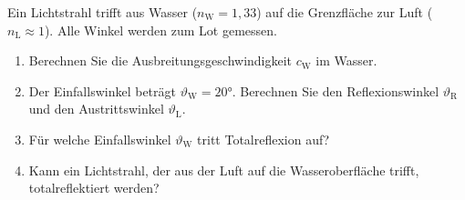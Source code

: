 \begin{ExerciseBlock}
Ein Lichtstrahl trifft aus Wasser ($n_\mathrm W=1{,}33$) auf die Grenzfläche zur Luft ($n_\mathrm L\approx 1$). Alle Winkel werden zum Lot gemessen.
\begin{center}
\end{center}
\begin{enumerate}
\item Berechnen Sie die Ausbreitungsgeschwindigkeit $c_\mathrm W$ im Wasser.
\item Der Einfallswinkel beträgt $\vartheta_\mathrm W=\ang{20}$. Berechnen Sie den Reflexionswinkel $\vartheta_\mathrm R$ und den Austrittswinkel $\vartheta_\mathrm L$.
\item Für welche Einfallswinkel $\vartheta_\mathrm W$ tritt Totalreflexion auf?
\item Kann ein Lichtstrahl, der aus der Luft auf die Wasseroberfläche trifft, totalreflektiert werden?
\end{enumerate}
\end{ExerciseBlock}
